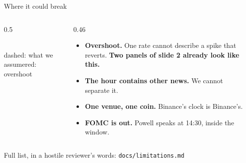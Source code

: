 \documentclass[aspectratio=169,11pt]{beamer}
\newcommand{\lead}[1]{{\color{accent}\bfseries #1}}
\newcommand{\bad}[1]{{\color{warn}\bfseries #1}}
\begin{document}
\begin{frame}{Where it could break}
\vspace{0.5em}
\begin{columns}[T,onlytextwidth]
\begin{column}{0.5\textwidth}
\centering
{}\\[0.2em]
{\scriptsize\color{muted}dashed: what we assume\quad\color{warn}red: overshoot}
\end{column}
\begin{column}{0.46\textwidth}
\vspace{0.6em}
\begin{itemize}\setlength\itemsep{0.65em}\small
\item \bad{Overshoot.} One rate cannot describe a spike that reverts. \lead{Two panels of slide 2 already look like this.}
\item \bad{The hour contains other news.} We cannot separate it.
\item \bad{One venue, one coin.} Binance's clock is Binance's.
\item \bad{FOMC is out.} Powell speaks at 14:30, inside the window.
\end{itemize}
\end{column}
\end{columns}
\vspace{0.5em}
\begin{center}
{\color{muted}\small Full list, in a hostile reviewer's words: \texttt{docs/limitations.md}}
\end{center}
\end{frame}
\end{document}
